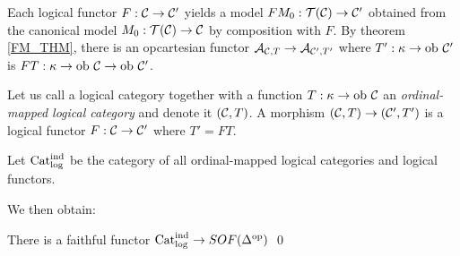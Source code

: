 Each logical functor $F : {{\bf \cal C}} \to {{\bf \cal C}'}$ yields a model $FM_0 
: {\cal T}({{\bf \cal C}}) \to {{\bf \cal C}'}$ obtained from the canonical model 
$M_0 : {\cal T}({{\bf \cal C} }) \to {{\bf \cal C}}$ by composition with $F$. By 
theorem \ref{FM_THM}, there is an opcartesian functor ${{{\bf \cal A}}_{{{\bf \cal C}},T}} \to 
{{{\bf \cal A}}_{{{\bf \cal C}'},T'}}$ where $T' : \kappa \to \mbox{ob }{{\bf \cal C}'}$ is $FT : 
\kappa \to \mbox{ob }{{\bf \cal C}} \to \mbox{ob }{{\bf \cal C}'}$.

Let us call a logical category together with a function $T : \kappa 
\to \mbox{ob }{{\bf \cal C}}$ an {\em ordinal-mapped logical category} and 
denote it $({{\bf \cal C}},T)$. A morphism $({{\bf \cal C}},T) \to ({{\bf \cal C}'},T')$ 
is a logical functor $F : {{\bf \cal C}} \to {{\bf \cal C}'}$ where $T'=FT$. 

Let ${\mbox{Cat}}^{\rm ind}_{\rm log}$ be the category of all 
ordinal-mapped logical categories and logical functors. 

We then obtain:

\begin{thm} There is a faithful functor ${\mbox{Cat}}^{\rm ind}_{\rm 
log} \to {SOF}(\Delta^{\rm op})$ \qed \end{thm} 



%


